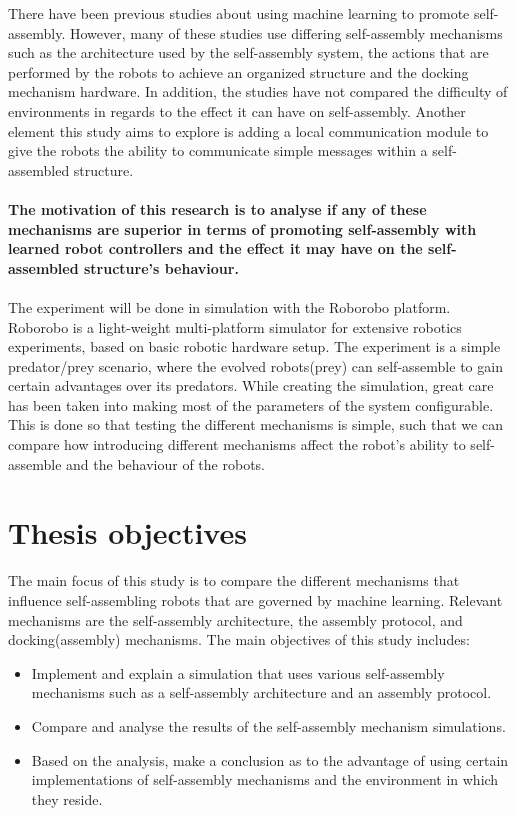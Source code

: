 There have been previous studies about using machine learning to promote self-assembly\cite{trianni_evolving_2004, montanier_adaptive_2014, li_co-evolution_2015}. 
However, many of these studies use differing self-assembly mechanisms such as the architecture used by the self-assembly system, the actions that are performed by the robots to achieve an organized structure and the docking mechanism hardware.
In addition, the studies have not compared the difficulty of environments in regards to the effect it can have on self-assembly.
Another element this study aims to explore is adding a local communication module to give the robots the ability to communicate simple messages within a self-assembled structure.\\ \\
\textbf{The motivation of this research is to analyse if any of these mechanisms are superior in terms of promoting self-assembly with learned robot controllers and the effect it may have on the self-assembled structure's behaviour.\\ \\}
The experiment will be done in simulation with the Roborobo platform\cite{bredeche_roborobo!_2013}. 
Roborobo is a light-weight multi-platform simulator for extensive robotics experiments, based on basic robotic hardware setup.
The experiment is a simple predator/prey scenario, where the evolved robots(prey) can self-assemble to gain certain advantages over its predators.
While creating the simulation, great care has been taken into making most of the parameters of the system configurable.
This is done so that testing the different mechanisms is simple, such that we can compare how introducing different mechanisms affect the robot's ability to self-assemble and the behaviour of the robots.

\section{Thesis objectives}
The main focus of this study is to compare the different mechanisms that influence self-assembling robots that are governed by machine learning. 
Relevant mechanisms are the self-assembly architecture, the assembly protocol, and docking(assembly) mechanisms. 
The main objectives of this study includes:

\begin{itemize}
	
	\item Implement and explain a simulation that uses various self-assembly mechanisms such as a self-assembly architecture and an assembly protocol.
	
	\item Compare and analyse the results of the self-assembly mechanism simulations. 
	
	\item Based on the analysis, make a conclusion as to the advantage of using certain implementations of self-assembly mechanisms and the environment in which they reside.
	
\end{itemize}

